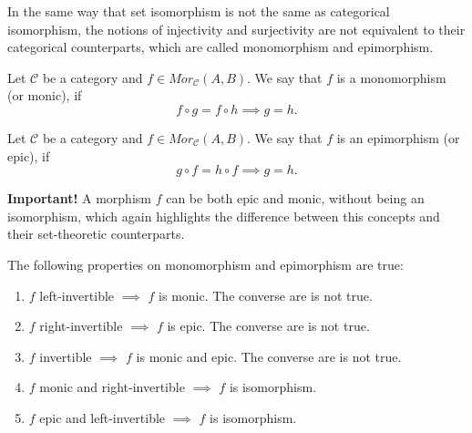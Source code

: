 In the same way that set isomorphism is not the same as categorical isomorphism,
the notions of injectivity and surjectivity are not equivalent to their categorical
counterparts, which are called monomorphism and epimorphism.

\begin{definition}[Monomorphism]
  Let $\mathcal C$ be a category and $f \in Mor_\mathcal C(A,B)$. We say that
  $f$ is a monomorphism (or monic), if
  \begin{displaymath}
    f \circ g = f \circ h \implies g = h.  
  \end{displaymath}
\end{definition}

\begin{definition}[Epimorphism]
  Let $\mathcal C$ be a category and $f \in Mor_\mathcal C(A,B)$. We say that
  $f$ is an epimorphism (or epic), if
  \begin{displaymath}
    g \circ f = h \circ f \implies g = h.
  \end{displaymath}
\end{definition}
\textbf{Important!} A morphism $f$ can be both epic and monic, without being
an isomorphism, which again highlights the difference between this concepts and their
set-theoretic counterparts.

\begin{proposition}
  The following properties on monomorphism and epimorphism are true:
  \begin{enumerate}[1.]
    \item $f$ left-invertible $\implies$ $f$ is monic. The converse are is not true.
    \item $f$ right-invertible $\implies$ $f$ is epic. The converse are is not true.
    \item $f$ invertible $\implies$ $f$ is monic and epic. The converse are is not true.
    \item $f$ monic and right-invertible $\implies $ $f$ is isomorphism.
    \item $f$ epic and left-invertible $\implies $ $f$ is isomorphism.
  \end{enumerate}
\end{proposition}

